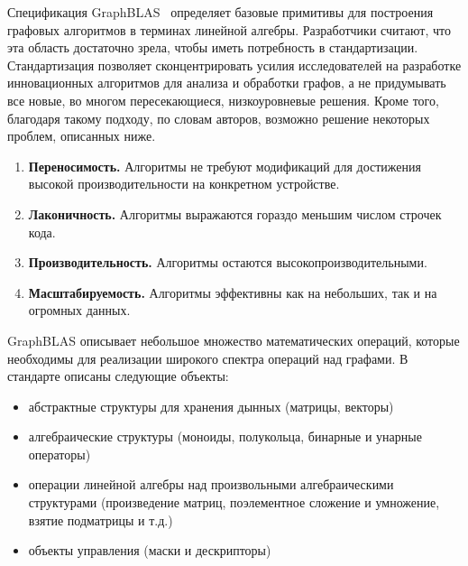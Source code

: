 Спецификация GraphBLAS~\cite{gb_math} определяет базовые примитивы для построения графовых алгоритмов в терминах линейной алгебры. Разработчики считают, что эта область достаточно зрела, чтобы иметь потребность в стандартизации. Стандартизация позволяет сконцентрировать усилия исследователей на разработке инновационных алгоритмов для анализа и обработки графов, а не придумывать все новые, во многом пересекающиеся, низкоуровневые решения. Кроме того, благодаря такому подходу, по словам авторов\cite{sevengr}, возможно решение некоторых проблем, описанных ниже.
\begin{enumerate}
    \item \textbf{Переносимость.} Алгоритмы не требуют модификаций для достижения высокой производительности на конкретном устройстве.
    \item \textbf{Лаконичность.} Алгоритмы выражаются гораздо меньшим числом строчек кода.
    \item \textbf{Производительность.} Алгоритмы остаются высокопроизводительными.
    \item \textbf{Масштабируемость.} Алгоритмы эффективны как на небольших, так и на огромных данных.
\end{enumerate}


GraphBLAS описывает небольшое множество математических операций, которые необходимы для реализации широкого спектра операций над графами. В стандарте описаны следующие объекты:
\begin{itemize}
    \item абстрактные структуры для хранения дынных (матрицы, векторы)
    \item алгебраические структуры (моноиды, полукольца, бинарные и унарные операторы)
    \item операции линейной алгебры над произвольными алгебраическими структурами (произведение матриц, поэлементное сложение и умножение, взятие подматрицы и т.д.)
    \item объекты управления (маски и дескрипторы)
\end{itemize}

